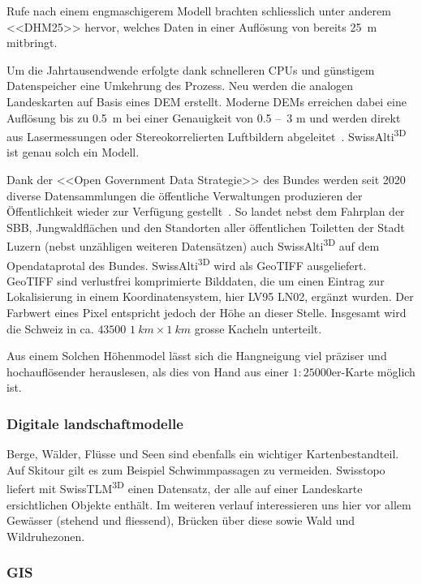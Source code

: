 Rufe nach einem engmaschigerem Modell brachten schliesslich unter anderem <<DHM25>> hervor, welches Daten in einer Auflösung von bereits \qty{25}{m} mitbringt.~\cite{swisstopohistdem}

Um die Jahrtausendwende erfolgte dank schnelleren CPUs und günstigem Datenspeicher eine Umkehrung des Prozess. Neu werden die analogen Landeskarten auf Basis eines DEM erstellt. Moderne DEMs erreichen dabei eine Auflösung bis zu \qty{0.5}{m} bei einer Genauigkeit von 0.5 --~3 \unit{m} und werden direkt aus Lasermessungen oder Stereokorrelierten Luftbildern abgeleitet~\cite{alti3dprod}. SwissAlti\textsuperscript{3D} ist genau solch ein Modell.

Dank der <<Open Government Data Strategie>> des Bundes werden seit 2020 diverse Datensammlungen die öffentliche Verwaltungen produzieren der Öffentlichkeit wieder zur Verfügung gestellt~\cite{opendataswiss}.
So landet nebst dem Fahrplan der SBB, Jungwaldflächen und den Standorten aller öffentlichen Toiletten der Stadt Luzern (nebst unzähligen weiteren Datensätzen) auch  SwissAlti\textsuperscript{3D} auf dem Opendataprotal des Bundes.
SwissAlti\textsuperscript{3D} wird als GeoTIFF ausgeliefert. GeoTIFF sind verlustfrei komprimierte Bilddaten, die um einen Eintrag zur Lokalisierung in einem Koordinatensystem, hier LV95 LN02, ergänzt wurden. Der Farbwert eines Pixel entspricht jedoch der Höhe an dieser Stelle. Insgesamt wird die Schweiz in ca. $43500$ $\qty{1}{km} \times \qty{1}{km}$ grosse Kacheln unterteilt.~\cite{alti3dprod} 

Aus einem Solchen Höhenmodel lässt sich die Hangneigung viel präziser und hochauflösender herauslesen, als dies von Hand aus einer $1:25000$er-Karte möglich ist.

\subsubsection{Digitale landschaftmodelle}

Berge, Wälder, Flüsse und Seen sind ebenfalls ein wichtiger Kartenbestandteil. Auf Skitour gilt es zum Beispiel Schwimmpassagen zu vermeiden. Swisstopo liefert mit SwissTLM\textsuperscript{3D} einen Datensatz, der alle auf einer Landeskarte ersichtlichen Objekte enthält. Im weiteren verlauf interessieren uns hier vor allem Gewässer (stehend und fliessend), Brücken über diese sowie Wald und Wildruhezonen.

\subsubsection{GIS}\label{sec:gis}


